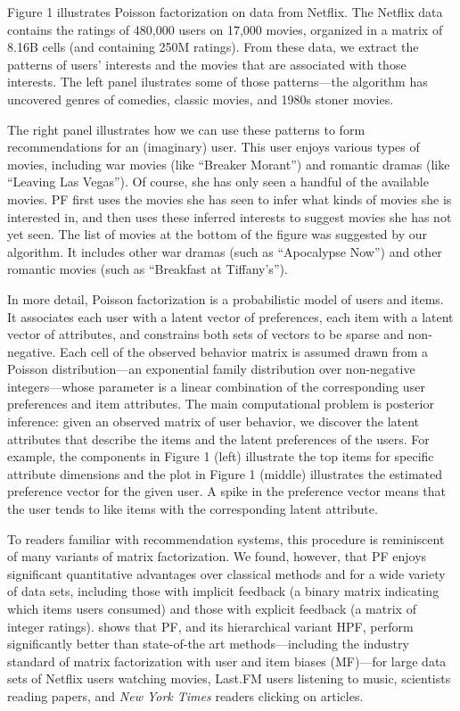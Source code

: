 Figure 1 illustrates Poisson factorization on data from Netflix.  The
Netflix data contains the ratings of 480,000 users on 17,000 movies,
organized in a matrix of 8.16B cells (and containing 250M ratings).
From these data, we extract the patterns of users' interests and the
movies that are associated with those interests.  The left panel
ilustrates some of those patterns---the algorithm has uncovered genres
of comedies, classic movies, and 1980s stoner movies.

The right panel illustrates how we can use these patterns to form
recommendations for an (imaginary) user.  This user enjoys various
types of movies, including war movies (like ``Breaker Morant'') and
romantic dramas (like ``Leaving Las Vegas'').  Of course, she has only
seen a handful of the available movies.  PF first uses the movies she
has seen to infer what kinds of movies she is interested in, and then
uses these inferred interests to suggest movies she has not yet seen.
The list of movies at the bottom of the figure was suggested by our
algorithm. It includes other war dramas (such as ``Apocalypse Now'')
and other romantic movies (such as ``Breakfast at Tiffany's'').

In more detail, Poisson factorization is a probabilistic model of
users and items.  It associates each user with a latent vector of
preferences, each item with a latent vector of attributes, and
constrains both sets of vectors to be sparse and non-negative.  Each
cell of the observed behavior matrix is assumed drawn from a Poisson
distribution---an exponential family distribution over non-negative
integers---whose parameter is a linear combination of the
corresponding user preferences and item attributes.  The main
computational problem is posterior inference: given an observed matrix
of user behavior, we discover the latent attributes that describe the
items and the latent preferences of the users.  For example, the
components in Figure 1 (left) illustrate the top items for specific
attribute dimensions and the plot in Figure 1 (middle) illustrates the
estimated preference vector for the given user.  A spike in the
preference vector means that the user tends to like items with the
corresponding latent attribute.

To readers familiar with recommendation systems, this procedure is
reminiscent of many variants of matrix factorization.  We found,
however, that PF enjoys significant quantitative advantages over
classical methods and for a wide variety of data sets, including those
with implicit feedback (a binary matrix indicating which items users
consumed) and those with explicit feedback (a matrix of integer
ratings).   shows that PF, and its hierarchical variant
HPF, perform significantly better than state-of-the art
methods---including the industry standard of matrix factorization with
user and item biases (MF)---for large data sets of Netflix users
watching movies, Last.FM users listening to music, scientists reading
papers, and \textit{New York Times} readers clicking on articles.

